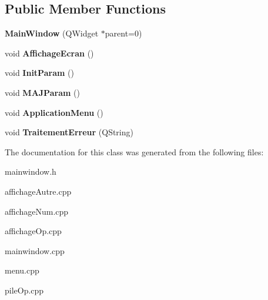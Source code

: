 \subsection*{Public Member Functions}
\begin{DoxyCompactItemize}
\item 
\hypertarget{class_main_window_a8b244be8b7b7db1b08de2a2acb9409db}{{\bfseries Main\-Window} (Q\-Widget $\ast$parent=0)}\label{class_main_window_a8b244be8b7b7db1b08de2a2acb9409db}

\item 
\hypertarget{class_main_window_ac78de1f17d1e936e0b5efa2b7d0e5804}{void {\bfseries Affichage\-Ecran} ()}\label{class_main_window_ac78de1f17d1e936e0b5efa2b7d0e5804}

\item 
\hypertarget{class_main_window_a19564c9faee3e04539c431230b0beb03}{void {\bfseries Init\-Param} ()}\label{class_main_window_a19564c9faee3e04539c431230b0beb03}

\item 
\hypertarget{class_main_window_af644382f0604f07829f789f2c807e06f}{void {\bfseries M\-A\-J\-Param} ()}\label{class_main_window_af644382f0604f07829f789f2c807e06f}

\item 
\hypertarget{class_main_window_a6cd67d43f112d2035d240b4f3f219b75}{void {\bfseries Application\-Menu} ()}\label{class_main_window_a6cd67d43f112d2035d240b4f3f219b75}

\item 
\hypertarget{class_main_window_ae7de56fcd961e099f6df85baab3b8022}{void {\bfseries Traitement\-Erreur} (Q\-String)}\label{class_main_window_ae7de56fcd961e099f6df85baab3b8022}

\end{DoxyCompactItemize}


The documentation for this class was generated from the following files\-:\begin{DoxyCompactItemize}
\item 
mainwindow.\-h\item 
affichage\-Autre.\-cpp\item 
affichage\-Num.\-cpp\item 
affichage\-Op.\-cpp\item 
mainwindow.\-cpp\item 
menu.\-cpp\item 
pile\-Op.\-cpp\end{DoxyCompactItemize}
